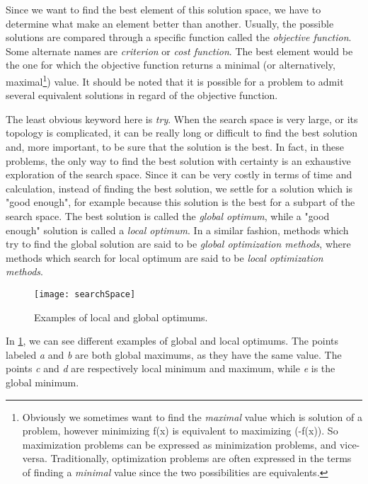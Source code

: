 Since we want to find the best element of this solution space, we have to determine what make an element better than another. Usually, the possible solutions are compared through a specific function called the \emph{objective function}. Some alternate names are \emph{criterion} or \emph{cost function}. The best element would be the one for which the objective function returns a minimal (or alternatively, maximal\footnote{Obviously we sometimes want to find the \emph{maximal} value which is solution of a problem, however minimizing f(x) is equivalent to maximizing (-f(x)). So maximization problems can be expressed as minimization problems, and vice-versa. Traditionally, optimization problems are often expressed in the terms of finding a \emph{minimal} value since the two possibilities are equivalents.}) value. It should be noted that it is possible for a problem to admit several equivalent solutions in regard of the objective function.


The least obvious keyword here is \emph{try}. When the search space is very large, or its topology is complicated, it can be really long or difficult to find the best solution and, more important, to be sure that the solution is the best. In fact, in these problems, the only way to find the best solution with certainty is an exhaustive exploration of the search space. Since it can be very costly in terms
of time and calculation, instead of finding the best solution, we settle for a solution which is "good enough", for example because this solution is the best for a subpart of the search space. The best solution is called the \emph{global optimum}, while a "good enough" solution is called a \emph{local optimum}. In a similar fashion, methods which try to find the global solution are said to be \emph{global optimization methods}, where methods which search for local optimum are said to be \emph{local optimization methods}.



\begin{figure}
\centering
\texttt{[image: searchSpace]}
\caption{Examples of local and global optimums.}
\label{localAndGlobalOptims}
\end{figure}

In \ref{localAndGlobalOptims}, we can see different examples of global and local optimums. The points labeled \emph{a} and \emph{b} are both global maximums, as they have the same value. The points
\emph{c} and \emph{d} are respectively local minimum and maximum, while \emph{e} is the global minimum.

